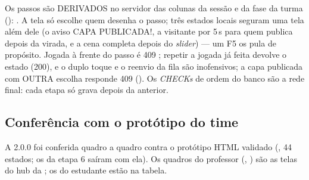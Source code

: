 Os passos são DERIVADOS no servidor das colunas da sessão e da fase da turma
():  \seta{}  \seta{}
 \seta{}  \seta{}  \seta{} 
\seta{}  \seta{}  \seta{}  \seta{}
. A tela só escolhe quem desenha o passo; três estados locais
seguram uma tela além dele (o aviso CAPA PUBLICADA!, a visitante por 5\,s para
quem publica depois da virada, e a cena completa depois do \emph{slider}) ---
um F5 os pula de propósito. Jogada à frente do passo é 409
; repetir a jogada já feita devolve o estado (200), e o
duplo toque e o reenvio da fila são inofensivos; a capa publicada com OUTRA
escolha responde 409 (). Os \emph{CHECKs} de ordem do banco
são a rede final: cada etapa só grava depois da anterior.

\subsection{Conferência com o protótipo do time}
\label{sec:exp02ef1b-prototipo}

A 2.0.0 foi conferida quadro a quadro contra o protótipo HTML validado
(, 44 estados; os da etapa 6 saíram com ela). Os quadros
do professor (, ) são as telas do hub da
; os do estudante estão na tabela.

